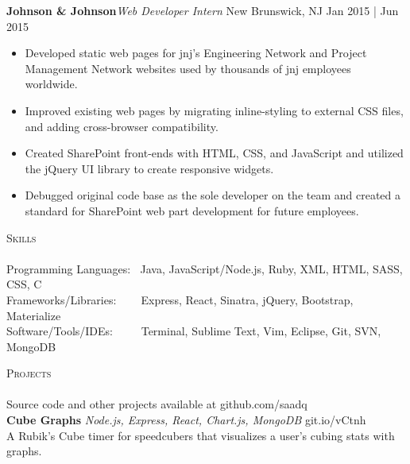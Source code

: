 \documentclass{article}
\newcommand{\lineunder} {
    \vspace*{-8pt} \\
    \hspace*{-18pt} \hrulefill \\
}
\newcommand{\header} [1] {
    {\hspace*{-18pt}\vspace*{6pt} \textsc{#1}}
    \vspace*{-6pt} \lineunder
}
\begin{document}
        {\textbf{Johnson \& Johnson}\hfill \textit{Web Developer Intern} \hfill New Brunswick, NJ \hfill Jan 2015 | Jun 2015 \\
        \vspace{-1mm}
        \begin{itemize} \itemsep 1pt
            \item Developed static web pages for jnj's Engineering Network and Project Management Network websites used by thousands of jnj employees worldwide.
            \item Improved existing web pages by migrating inline-styling to external CSS files, and adding cross-browser compatibility.
            \item Created SharePoint front-ends with HTML, CSS, and JavaScript and utilized the jQuery UI library to create responsive widgets.
            \item Debugged original code base as the sole developer on the team and created a standard for SharePoint web part development for future employees.
        \end{itemize}



    \header{Skills}

    {Programming Languages:} $\:$ Java, JavaScript/Node.js, Ruby, XML, HTML, SASS, CSS, C \vspace{1mm}
    {\\Frameworks/Libraries:} $\:$ $\:$ $\:$ $\:$Express, React, Sinatra, jQuery, Bootstrap, Materialize\vspace{1mm}
    {\\Software/Tools/IDEs:} $\:$ $\:$ $\:$ $\:$ Terminal, Sublime Text, Vim, Eclipse, Git, SVN, MongoDB

    \vspace{4mm}


    \header{Projects}
    Source code and other projects available at github.com/saadq \\
    \vspace{2mm}
    {\textbf{Cube Graphs} \sl Node.js, Express, React, Chart.js, MongoDB}  \hfill git.io/vCtnh \\
    A Rubik's Cube timer for speedcubers that visualizes a user's cubing stats with graphs.  \\

}
\end{document}
